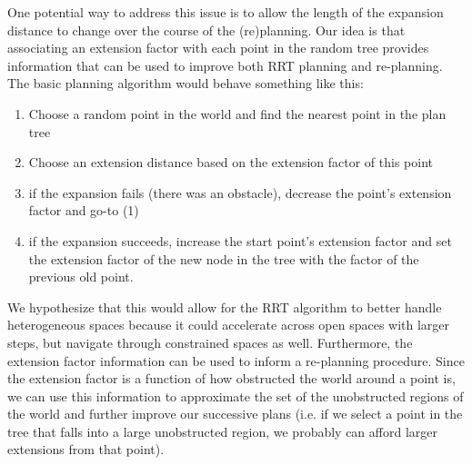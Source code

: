 \documentclass[10pt]{amsart}
\begin{document}
One potential way to address this issue is to allow the length of the expansion distance to change over the course of the (re)planning. 
Our idea is that associating an extension factor with each point in the random tree provides information that can be used to
improve both RRT planning and re-planning. 
The basic planning algorithm would behave something like this:
\begin{enumerate}
\item Choose a random point in the world and find the nearest point in the plan tree
\item Choose an extension distance based on the extension factor of this point
\item if the expansion fails (there was an obstacle), decrease the point's extension factor and go-to (1)
\item if the expansion succeeds, increase the start point's extension factor and set the extension factor of the new node in the tree with the factor of the previous old point.
\end{enumerate}
We hypothesize that this would allow for the RRT algorithm to better handle heterogeneous spaces because it could accelerate across open spaces with larger steps, but navigate through constrained spaces as well. Furthermore, the extension factor information can be used to inform a re-planning procedure. Since the extension factor is a function of how obstructed the world
around a point is, we can use this information to approximate the set of the unobstructed regions of the world and further improve
our successive plans (i.e. if we select a point in the tree that falls into a large unobstructed region, we probably can afford larger extensions from that point).
\end{document}
